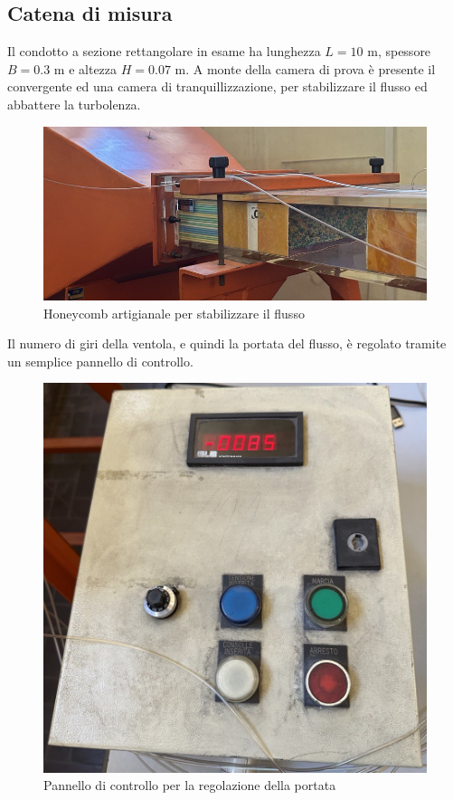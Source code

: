 \newpage
\subsection{Catena di misura}
Il condotto a sezione rettangolare in esame ha lunghezza $L=10$ m, spessore $B=0.3$ m e altezza $H=0.07$ m. A monte della camera di prova è presente il convergente ed una camera di tranquillizzazione, per stabilizzare il flusso ed abbattere la turbolenza.
\begin{figure}[H]
    \centering
    \includegraphics[width=.9\textwidth]{images/7/cannuccie.jpg}
    \caption{Honeycomb artigianale per stabilizzare il flusso}
\end{figure}

\noindent Il numero di giri della ventola, e quindi la portata del flusso, è regolato tramite un semplice pannello di controllo.
\begin{figure}[H]
    \centering
    \includegraphics[width=.45\textwidth]{images/7/regolatoreportata.jpg}
    \caption{Pannello di controllo per la regolazione della portata}
\end{figure}

